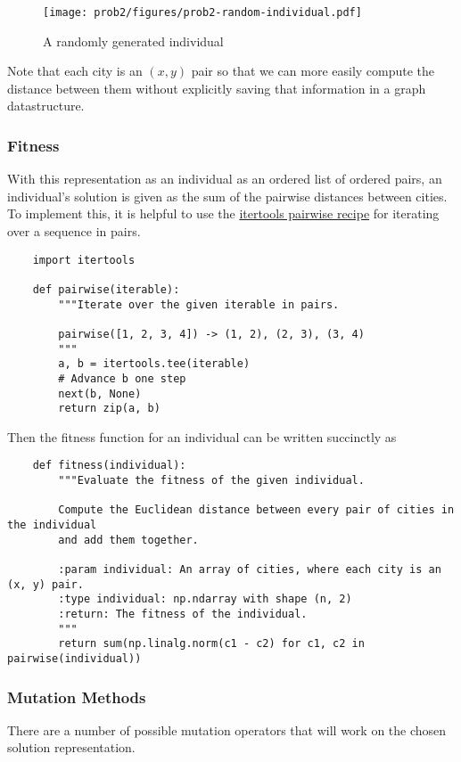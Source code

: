 \documentclass{article}
\begin{document}
\begin{figure}[h]
    \centering
    \texttt{[image: prob2/figures/prob2-random-individual.pdf]}
    \caption{A randomly generated individual}\label{fig:prob2:random-individual}
\end{figure}

Note that each city is an $(x, y)$ pair so that we can more easily compute the distance between
them without explicitly saving that information in a graph datastructure.

\subsubsection{Fitness}
With this representation as an individual as an ordered list of ordered pairs, an individual's
solution is given as the sum of the pairwise distances between cities. To implement this, it is
helpful to use the
\href{https://docs.python.org/3/library/itertools.html#itertools-recipes}{itertools pairwise
    recipe} for iterating over a sequence in pairs.
\begin{verbatim}
    import itertools

    def pairwise(iterable):
        """Iterate over the given iterable in pairs.

        pairwise([1, 2, 3, 4]) -> (1, 2), (2, 3), (3, 4)
        """
        a, b = itertools.tee(iterable)
        # Advance b one step
        next(b, None)
        return zip(a, b)
\end{verbatim}
Then the fitness function for an individual can be written succinctly as
\begin{verbatim}
    def fitness(individual):
        """Evaluate the fitness of the given individual.

        Compute the Euclidean distance between every pair of cities in the individual
        and add them together.

        :param individual: An array of cities, where each city is an (x, y) pair.
        :type individual: np.ndarray with shape (n, 2)
        :return: The fitness of the individual.
        """
        return sum(np.linalg.norm(c1 - c2) for c1, c2 in pairwise(individual))
\end{verbatim}

\subsubsection{Mutation Methods}
There are a number of possible mutation operators that will work on the chosen solution
representation.
\end{document}
